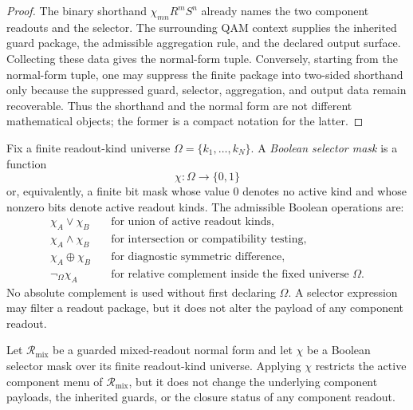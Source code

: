 \begin{proof}
The binary shorthand \(\chi_{mn}R^mS^n\) already names the two component readouts and the selector. The surrounding QAM context supplies the inherited guard package, the admissible aggregation rule, and the declared output surface. Collecting these data gives the normal-form tuple. Conversely, starting from the normal-form tuple, one may suppress the finite package into two-sided shorthand only because the suppressed guard, selector, aggregation, and output data remain recoverable. Thus the shorthand and the normal form are not different mathematical objects; the former is a compact notation for the latter.
\end{proof}

\begin{definition}\label{def:r03-boolean-selector-mask-grammar}
Fix a finite readout-kind universe \(\Omega=\{k_1,\dots,k_N\}\). A \emph{Boolean selector mask} is a function
\[
\chi:\Omega\longrightarrow\{0,1\}
\]
or, equivalently, a finite bit mask whose value 0 denotes no active kind and whose nonzero bits denote active readout kinds. The admissible Boolean operations are:
\begin{align*}
\chi_A\vee\chi_B &\quad\text{for union of active readout kinds,}\\
\chi_A\wedge\chi_B &\quad\text{for intersection or compatibility testing,}\\
\chi_A\oplus\chi_B &\quad\text{for diagnostic symmetric difference,}\\
\neg_{\Omega}\chi_A &\quad\text{for relative complement inside the fixed universe }\Omega.
\end{align*}
No absolute complement is used without first declaring \(\Omega\). A selector expression may filter a readout package, but it does not alter the payload of any component readout.
\end{definition}

\begin{proposition}\label{prop:r03-mask-filter-conservativity}
Let \(\mathcal R_{\mathrm{mix}}\) be a guarded mixed-readout normal form and let \(\chi\) be a Boolean selector mask over its finite readout-kind universe. Applying \(\chi\) restricts the active component menu of \(\mathcal R_{\mathrm{mix}}\), but it does not change the underlying component payloads, the inherited guards, or the closure status of any component readout.
\end{proposition}

